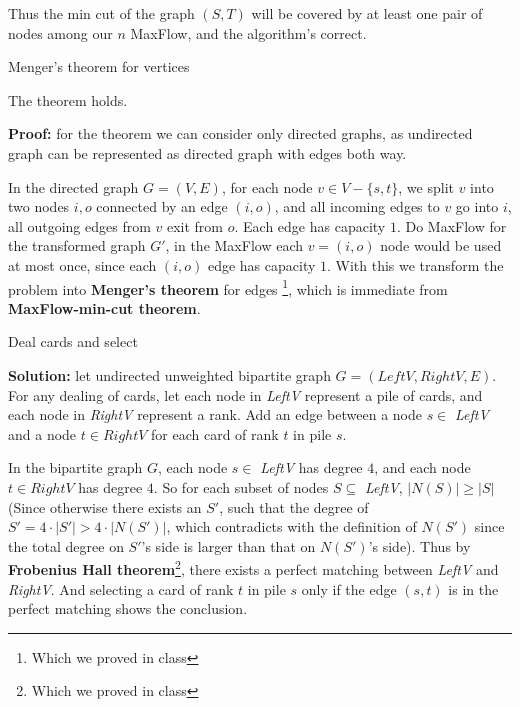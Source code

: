 \documentclass{article}
\begin{document}
\begin{description}
  Thus the min cut of the graph $(S, T)$ will be covered by at least one pair of nodes among our $n$ MaxFlow, and the algorithm's correct.

\item[2]{Menger's theorem for vertices}
  
  The theorem holds.

  \textbf{Proof:} for the theorem we can consider only directed graphs, as undirected graph can be represented as directed graph with edges both way.

  In the directed graph $G = (V, E)$, for each node $v \in V - \{s, t\}$, we split $v$ into two nodes $i, o$ connected by an edge $(i, o)$, and all incoming edges to $v$ go into $i$, all outgoing edges from $v$ exit from $o$. Each edge has capacity $1$. Do MaxFlow for the transformed graph $G'$, in the MaxFlow each $v = (i, o)$ node would be used at most once, since each $(i, o)$ edge has capacity $1$. With this we transform the problem into \textbf{Menger's theorem} for edges \footnote{Which we proved in class}, which is immediate from \textbf{MaxFlow-min-cut theorem}.


\item[3]{Deal cards and select}

  \textbf{Solution:} let undirected unweighted bipartite graph $G = (LeftV, RightV, E)$. For any dealing of cards, let each node in \textit{LeftV} represent a pile of cards, and each node in \textit{RightV} represent a rank. Add an edge between a node $s \in$ \textit{LeftV} and a node $t \in RightV$ for each card of rank $t$ in pile $s$.

  In the bipartite graph $G$, each node $s \in$ \textit{LeftV} has degree $4$, and each node $t \in RightV$ has degree $4$. So for each subset of nodes $S \subseteq$ \textit{LeftV}, $|N(S)| \geq |S|$ (Since otherwise there exists an $S'$, such that the degree of $S' = 4 \cdot |S'| > 4 \cdot |N(S')|$, which contradicts with the definition of $N(S')$ since the total degree on $S'$'s side is larger than that on $N(S')$'s side). Thus by \textbf{Frobenius Hall theorem}\footnote{Which we proved in class}, there exists a perfect matching between \textit{LeftV} and \textit{RightV}. And selecting a card of rank $t$ in pile $s$ only if the edge $(s,t)$ is in the perfect matching shows the conclusion.



\end{description}
\end{document}
